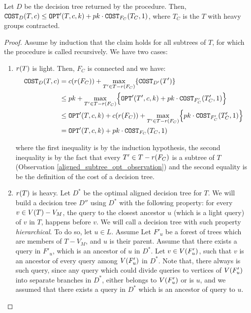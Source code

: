 \begin{lemma}
Let $D$ be the decision tree returned by the \FBuildDT procedure. Then, $\texttt{COST}_D\mathopen{}\left( T,c \right)\leq \texttt{OPT}'\mathopen{}\left( T,c, k \right) + pk\cdot \texttt{COST}_{F_C}\mathopen{}\left( T_C, 1 \right)$, where $T_C$ is the $T$ with heavy groups contracted.
\begin{proof}
    Assume by induction that the claim holds for all subtrees of $T$, for which the procedure is called recursively. We have two cases:
    \begin{enumerate}
        \item $r\mathopen{}\left( T \right)$ is light. Then, $F_C$ is connected and we have:
        \begin{align*}
        \texttt{COST}_{D}\mathopen{}\left( T,c \right)&=c\mathopen{}\left( r\mathopen{}\left( F_C \right) \right)+\max_{T'\in T-r\mathopen{}\left( F_C \right)}\mathopen{}\left\{ \texttt{COST}_{D'}\mathopen{}\left( T' \right) \right\} 
        \\&\leq 
        pk+\max_{T'\in T-r\mathopen{}\left( F_C \right)}\mathopen{}\left\{ \texttt{OPT}'\mathopen{}\left( T',c, k \right) + pk\cdot \texttt{COST}_{F'_C}\mathopen{}\left( T'_C,1 \right) \right\} 
        \\&\leq 
        \texttt{OPT}'\mathopen{}\left( T,c, k \right) + c\mathopen{}\left( r\mathopen{}\left( F_C \right) \right)+\max_{T'\in T-r\mathopen{}\left( F_C \right)}\mathopen{}\left\{ pk\cdot \texttt{COST}_{F'_C}\mathopen{}\left( T'_C,1 \right) \right\} 
        \\&= 
        \texttt{OPT}'\mathopen{}\left( T,c, k \right) + pk\cdot \texttt{COST}_{F_C}\mathopen{}\left( T_C,1 \right)
        \end{align*}

        where the first inequality is by the induction hypothesis, the second inequality is by the fact that every $T'\in T-r\mathopen{}\left( F_C \right)$ is a subtree of $T$ (Observation \ref{aligned_subtree_opt_observation}) and the second equality is be the definition of the cost of a decision tree.
        \item $r\mathopen{}\left( T \right)$ is heavy. Let $D^*$ be the optimal aligned decision tree for $T$. We will build a decision tree $D''$ using $D^*$ with the following property: for every $v\in V\mathopen{}\left( T \right)-V_M$, the query to the closest ancestor $u$ (which is a light query) of $v$ in $T$, happens before $v$. We will call a decision tree with such property \textit{hierarchical}. To do so, let $u\in L$. Assume Let $F'_u$ be a forest of trees which are members of $T-V_M$, and $u$ is their parent. Assume that there exists a query in $F'_u$, which is an ancestor of $u$ in $D^*$. Let $v\in V\mathopen{}\left( F'_u \right)$, such that $v$ is an ancestor of every query among $V\mathopen{}\left( F'_u \right)$ in $D^*$. Note that, there always is such query, since any query which could divide queries to vertices of $V\mathopen{}\left( F'_u \right)$ into separate branches in $D^*$, either belongs to $V\mathopen{}\left( F'_u \right)$ or is $u$, and we assumed that there exists a query in $D^*$ which is an ancestor of query to $u$. 
        

\end{enumerate}
\end{proof}
\end{lemma}
